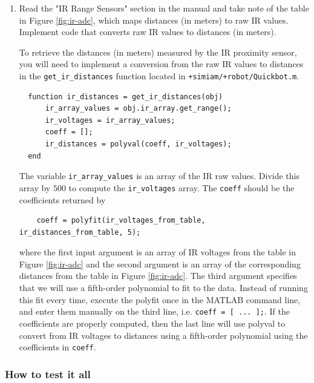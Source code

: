 \documentclass[10pt]{article}
\begin{document}
\begin{enumerate}
 \item Read the "IR Range Sensors" section in the manual and take note of the table in Figure \ref{fig:ir-adc}, which maps distances (in meters) to raw IR values. Implement code that converts raw IR values to distances (in meters).
 
 To retrieve the distances (in meters) measured by the IR proximity sensor, you will need to implement a conversion from the raw IR values to distances in the \texttt{get\_ir\_distances} function located in \texttt{+simiam/+robot/Quickbot.m}.
 \begin{verbatim}
  function ir_distances = get_ir_distances(obj)
      ir_array_values = obj.ir_array.get_range();
      ir_voltages = ir_array_values;
      coeff = [];
      ir_distances = polyval(coeff, ir_voltages);
  end\end{verbatim}
  The variable \texttt{ir\_array\_values} is an array of the IR raw values. Divide this array by $500$ to compute the \texttt{ir\_voltages} array. The \texttt{coeff} should be the coefficients returned by
  \begin{verbatim}
    coeff = polyfit(ir_voltages_from_table, ir_distances_from_table, 5);\end{verbatim}
where the first input argument is an array of IR voltages from the table in Figure \ref{fig:ir-adc} and the second argument is an array of the corresponding distances from the table in Figure \ref{fig:ir-adc}. The third argument specifies that we will use a fifth-order polynomial to fit to the data. Instead of running this fit every time, execute the polyfit once in the MATLAB command line, and enter them manually on the third line, i.e. \texttt{coeff = [ ... ];}. If the coefficients are properly computed, then the last line will use polyval to convert from IR voltages to distances using a fifth-order polynomial using the coefficients in \texttt{coeff}. 
 
\end{enumerate}

\subsubsection*{How to test it all}
\end{document}
